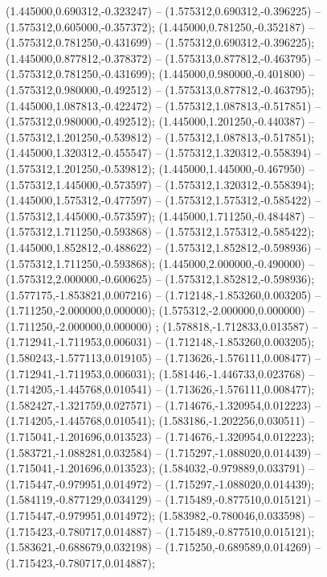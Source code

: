  (1.445000,0.690312,-0.323247) -- (1.575312,0.690312,-0.396225) -- (1.575312,0.605000,-0.357372);
 (1.445000,0.781250,-0.352187) -- (1.575312,0.781250,-0.431699) -- (1.575312,0.690312,-0.396225);
 (1.445000,0.877812,-0.378372) -- (1.575313,0.877812,-0.463795) -- (1.575312,0.781250,-0.431699);
 (1.445000,0.980000,-0.401800) -- (1.575312,0.980000,-0.492512) -- (1.575313,0.877812,-0.463795);
 (1.445000,1.087813,-0.422472) -- (1.575312,1.087813,-0.517851) -- (1.575312,0.980000,-0.492512);
 (1.445000,1.201250,-0.440387) -- (1.575312,1.201250,-0.539812) -- (1.575312,1.087813,-0.517851);
 (1.445000,1.320312,-0.455547) -- (1.575312,1.320312,-0.558394) -- (1.575312,1.201250,-0.539812);
 (1.445000,1.445000,-0.467950) -- (1.575312,1.445000,-0.573597) -- (1.575312,1.320312,-0.558394);
 (1.445000,1.575312,-0.477597) -- (1.575312,1.575312,-0.585422) -- (1.575312,1.445000,-0.573597);
 (1.445000,1.711250,-0.484487) -- (1.575312,1.711250,-0.593868) -- (1.575312,1.575312,-0.585422);
 (1.445000,1.852812,-0.488622) -- (1.575312,1.852812,-0.598936) -- (1.575312,1.711250,-0.593868);
 (1.445000,2.000000,-0.490000) -- (1.575312,2.000000,-0.600625) -- (1.575312,1.852812,-0.598936);
 (1.577175,-1.853821,0.007216) -- (1.712148,-1.853260,0.003205) -- (1.711250,-2.000000,0.000000);
 (1.575312,-2.000000,0.000000) -- (1.711250,-2.000000,0.000000) ;
 (1.578818,-1.712833,0.013587) -- (1.712941,-1.711953,0.006031) -- (1.712148,-1.853260,0.003205);
 (1.580243,-1.577113,0.019105) -- (1.713626,-1.576111,0.008477) -- (1.712941,-1.711953,0.006031);
 (1.581446,-1.446733,0.023768) -- (1.714205,-1.445768,0.010541) -- (1.713626,-1.576111,0.008477);
 (1.582427,-1.321759,0.027571) -- (1.714676,-1.320954,0.012223) -- (1.714205,-1.445768,0.010541);
 (1.583186,-1.202256,0.030511) -- (1.715041,-1.201696,0.013523) -- (1.714676,-1.320954,0.012223);
 (1.583721,-1.088281,0.032584) -- (1.715297,-1.088020,0.014439) -- (1.715041,-1.201696,0.013523);
 (1.584032,-0.979889,0.033791) -- (1.715447,-0.979951,0.014972) -- (1.715297,-1.088020,0.014439);
 (1.584119,-0.877129,0.034129) -- (1.715489,-0.877510,0.015121) -- (1.715447,-0.979951,0.014972);
 (1.583982,-0.780046,0.033598) -- (1.715423,-0.780717,0.014887) -- (1.715489,-0.877510,0.015121);
 (1.583621,-0.688679,0.032198) -- (1.715250,-0.689589,0.014269) -- (1.715423,-0.780717,0.014887);
